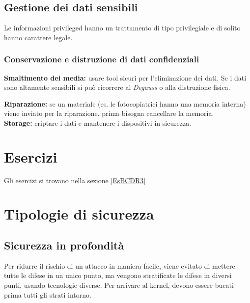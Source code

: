 \subsection{Gestione dei dati sensibili}

Le informazioni privileged hanno un trattamento di tipo privilegiale e di
solito hanno carattere legale.

\subsubsection{Conservazione e distruzione di dati confidenziali}

\textbf{Smaltimento dei media:} usare tool sicuri per l'eliminazione dei dati. 
Se i dati sono altamente sensibili si può ricorrere al \textit{Degauss} o alla 
distruzione fisica.\\
\newline 

\textbf{Riparazione:} se un materiale (es. le fotocopiatrici hanno una memoria 
interna) viene inviato per la riparazione, prima bisogna cancellare la memoria.
\\
\newline
\textbf{Storage:} criptare i dati e mantenere i dispositivi in sicurezza.

\section{Esercizi}

Gli esercizi si trovano nella sezione \ref{EsBCDR3}

\section{Tipologie di sicurezza}

\subsection{Sicurezza in profondità}

Per ridurre il rischio di un attacco in maniera facile, viene evitato di
mettere tutte le difese in un unico punto, ma vengono stratificate le difese in
diversi punti, usando tecnologie diverse.
Per arrivare al kernel, devono essere bucati prima tutti gli strati intorno.
